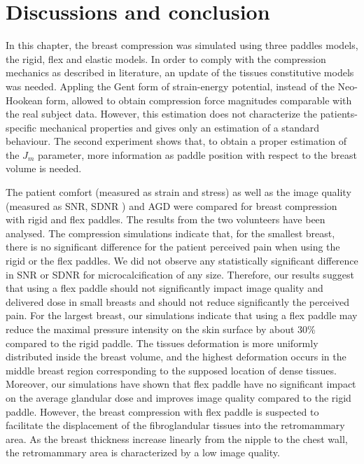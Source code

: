 \section{Discussions and conclusion}\label{section:compressionfem:conclusion}

In this chapter, the breast compression was simulated using three paddles models, the rigid, flex and elastic models. In order to comply with the compression mechanics as described in literature, an update of the tissues constitutive models was needed. Appling the Gent form of strain-energy potential, instead of the Neo-Hookean form, allowed to obtain compression force magnitudes comparable with the real subject data.  
However, this estimation does not characterize the patients-specific mechanical properties and gives only an estimation of a standard behaviour.  The second experiment shows that, to obtain a proper estimation of the $J_m$ parameter, more information as paddle position with respect to the breast volume is needed. 

The patient comfort (measured as strain and stress) as well as the image quality (measured as SNR, SDNR ) and AGD were compared for breast compression with rigid and flex paddles. The results from the two volunteers have been analysed. The compression simulations indicate that, for the smallest breast, there is no significant difference for the patient perceived pain when using the rigid or the flex paddles. We did not observe any statistically significant difference in SNR or SDNR for microcalcification of any size. Therefore, our results suggest that using a flex paddle should not significantly impact image quality and delivered dose in small breasts and should not reduce significantly the perceived pain.   
For the largest breast, our simulations indicate that using a flex paddle may reduce the maximal pressure intensity on the skin surface by about 30\% compared to the rigid paddle. The tissues deformation is more uniformly distributed inside the breast volume, and the highest deformation occurs in the middle breast region corresponding to the supposed location of dense tissues. Moreover, our simulations have shown that flex paddle have no significant impact on the average glandular dose and improves image quality compared to the rigid paddle. However, the breast compression with flex paddle is suspected to facilitate the displacement of the fibroglandular tissues into the retromammary area. As the breast thickness increase linearly from the nipple to the chest wall, the retromammary area is characterized by a low image quality. 


